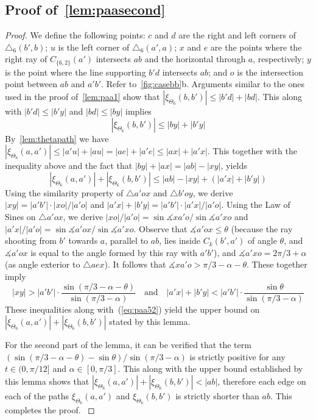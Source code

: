 \documentclass[runningheads,a4paper]{llncs}
\newcommand{\ABox}{
\raisebox{3pt}{\framebox[6pt]{\rule{6pt}{0pt}}}
}
\newcommand{\pp}{\xi}
\newcommand{\ang}{\measuredangle}
\begin{document}
\subsection{Proof of~\autoref{lem:paasecond}}

\aasecondlemma*

\begin{proof}
We define the following points: $c$ and $d$ are the right and left corners of $\triangle_6(b', b)$; $u$ is the left corner of $\triangle_6(a', a)$; $x$ and $e$ are the points where the right ray of $C_{\{6,2\}}(a')$ intersects $ab$ and the horizontal through $a$, respectively; $y$ is the point where the line supporting $b'd$ intersects $ab$; and $o$ is the intersection point between $ab$ and $a'b'$. Refer to~\autoref{fig:casebb}b. Arguments similar to the ones used in the proof of~\autoref{lem:paa1} show that $|\pp_{\Theta_6}(b, b')| \le |b'd| + |bd|$. This along with $|b'd| \le |b'y|$ and $|bd| \le |by|$ implies 
\begin{equation*}
|\pp_{\Theta_6}(b, b')| \le |by| + |b'y|
\label{eq:paa51}
\end{equation*}
By~\autoref{lem:thetapath} we have  
$|\pp_{\Theta_6}(a, a')| \le |a'u| + |au| = |ae| + |a'e| \le |ax| + |a'x|$. This together with the inequality above and the fact that 
$|by| + |ax| = |ab| - |xy|$,  yields 
\begin{equation}
|\pp_{\Theta_6}(a, a')| + |\pp_{\Theta_6}(b, b')| \le |ab| - |xy| + (|a'x|+|b'y|)
\label{eq:paa52}
\end{equation}
Using the similarity property of $\triangle a'ox$ and $\triangle b'oy$, we derive $|xy| =  |a'b'| \cdot  |xo| / |a'o|$ and 
$|a'x|+|b'y| = |a'b'|\cdot |a'x|/|a'o|$.
Using the Law of Sines on $\triangle a'ox$, we derive 
$|xo|/|a'o| = \sin\ang{xa'o}/\sin\ang{a'xo}$ and 
$|a'x|/|a'o| = \sin\ang{a'ox}/\sin\ang{a'xo}$.
Observe that $\ang{a'ox} \le \theta$ (because the ray shooting from $b'$ towards $a$, parallel to $ab$, lies inside $C_k(b',a')$ of angle $\theta$, and $\ang{a'ox}$ is equal to the angle formed by this ray with $a'b'$), and $\ang{a'xo} =2\pi/3+\alpha$ (as angle exterior to $\triangle aex$). It follows that $\ang{xa'o} > \pi/3-\alpha-\theta$. These together imply
\begin{equation*}
|xy| > |a'b'|\cdot\frac{\sin(\pi/3-\alpha-\theta)}{\sin(\pi/3-\alpha)} \mbox{~~~and~~~}  |a'x|+|b'y| < |a'b'|\cdot\frac{\sin\theta}{\sin(\pi/3-\alpha)}
\end{equation*}
These inequalities along with~(\ref{eq:paa52}) yield
the upper bound on $|\pp_{\Theta_6}(a, a')|+|\pp_{\Theta_6}(b, b')|$ stated by this lemma.



For the second part of the lemma, it can be verified that the term $(\sin(\pi/3-\alpha-\theta)-\sin\theta)/\sin(\pi/3-\alpha)$ is strictly positive for any $t \in (0, \pi/12]$ and $\alpha \in [0, \pi/3]$. This along with the upper bound established by this lemma shows that $|\pp_{\Theta_6}(a, a')| + |\pp_{\Theta_6}(b, b')| < |ab|$, therefore each edge on each of the paths $\pp_{\Theta_6}(a,a')$ and $\pp_{\Theta_6}(b,b')$ is strictly shorter than $ab$. This completes the proof.
{\hfill\ABox}\end{proof}
\end{document}
